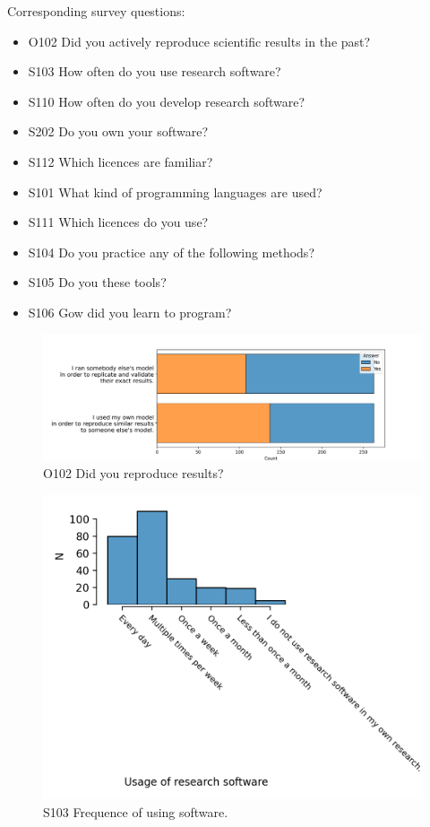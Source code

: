 \documentclass{article}
\begin{document}
Corresponding survey questions:
\begin{itemize}
	\item O102 Did you actively reproduce scientific results in the past?
	\item S103 How often do you use research software?
	\item S110 How often do you develop research software?
	\item S202 Do you own your software?
	\item S112 Which licences are familiar?
	\item S101 What kind of programming languages are used?
	\item S111 Which licences do you use?
	\item S104 Do you practice any of the following methods?
	\item S105 Do you these tools?
	\item S106 Gow did you learn to program?
\end{itemize}

\begin{figure}[!p]
    \centering
    \includegraphics[width=\textwidth]{../figs/O102.png}
	\caption{O102 Did you reproduce results?}
    \label{fig:O102}
\end{figure}

\begin{figure}[!p]
    \centering
    \includegraphics[width=\textwidth]{../figs/S103.png}
	\caption{S103 Frequence of using software.}
    \label{fig:S103}
\end{figure}
\end{document}
